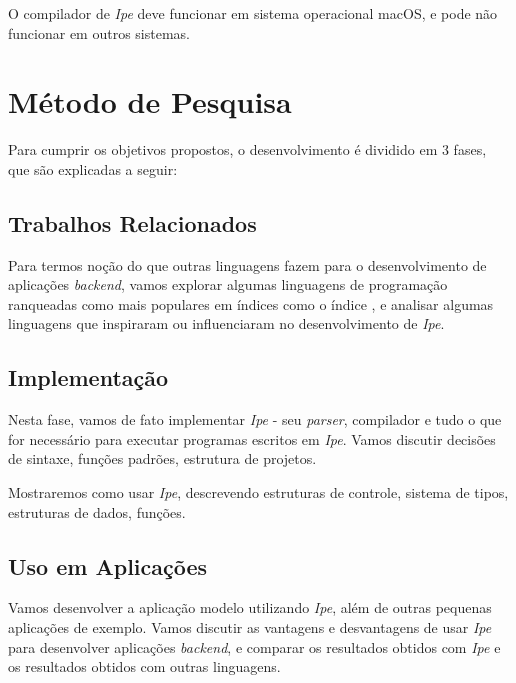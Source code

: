 O compilador de \textit{Ipe} deve funcionar em sistema operacional macOS, e pode
não funcionar em outros sistemas.

\section{Método de Pesquisa}

Para cumprir os objetivos propostos, o desenvolvimento é dividido em 3 fases, que
são explicadas a seguir:

\subsection{Trabalhos Relacionados}

Para termos noção do que outras linguagens fazem para o desenvolvimento de
aplicações \textit{backend}, vamos explorar algumas linguagens de programação
ranqueadas como mais populares em índices como o índice \textcite{tiobeindex}, e analisar algumas
linguagens que inspiraram ou influenciaram no desenvolvimento de \textit{Ipe}.

\subsection{Implementação}

Nesta fase, vamos de fato implementar \textit{Ipe} - seu \textit{parser}, compilador
e tudo o que for necessário para executar programas escritos em \textit{Ipe}.
Vamos discutir decisões de sintaxe, funções padrões, estrutura de projetos.

Mostraremos como usar \textit{Ipe}, descrevendo estruturas de controle, sistema
de tipos, estruturas de dados, funções.

\subsection{Uso em Aplicações}

Vamos desenvolver a aplicação modelo utilizando \textit{Ipe}, além de outras
pequenas aplicações de exemplo. Vamos discutir as vantagens e desvantagens de
usar \textit{Ipe} para desenvolver aplicações \textit{backend}, e comparar os
resultados obtidos com \textit{Ipe} e os resultados obtidos com outras linguagens.
